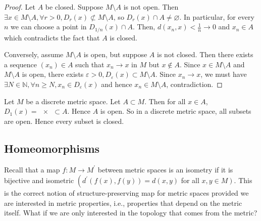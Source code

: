\documentclass[a4paper]{article}
\begin{document}
\begin{proof}
	Let \( A \) be closed.
	Suppose \( M \setminus A \) is not open.
	Then \( \exists x \in M \setminus A, \forall r > 0, D_r(x) \not\subset M \setminus A \), so \( D_r(x) \cap A \neq \varnothing \).
	In particular, for every \( n \) we can choose a point in \( D_{1/n}(x) \cap A \).
	Then, \( d(x_n,x) < \frac{1}{n} \to 0 \) and \( x_n \in A \) which contradicts the fact that \( A \) is closed.

	Conversely, assume \( M \setminus A \) is open, but suppose \( A \) is not closed.
	Then there exists a sequence \( (x_n) \in A \) such that \( x_n \to x \) in \( M \) but \( x \not\in A \).
	Since \( x \in M \setminus A \) and \( M \setminus A \) is open, there exists \( \varepsilon > 0, D_\varepsilon(x) \subset M \setminus A \).
	Since \( x_n \to x \), we must have \( \exists N \in \mathbb N, \forall n \geq N, x_n \in D_\varepsilon(x) \) and hence \( x_n \in M \setminus A \), contradiction.
\end{proof}
\begin{example}
	Let \( M \) be a discrete metric space.
	Let \( A \subset M \).
	Then for all \( x \in A \), \( D_1(x) = \qty{x} \subset A \).
	Hence \( A \) is open.
	So in a discrete metric space, all subsets are open.
	Hence every subset is closed.
\end{example}

\subsection{Homeomorphisms}
Recall that a map $f: M \rightarrow M^{\prime}$ between metric spaces is an isometry if it is bijective and isometric $\left(d^{\prime}(f(x), f(y))=d(x, y)\right.$ for all $\left.x, y \in M\right)$. This is the correct notion of structure-preserving map for metric spaces provided we are interested in metric properties, i.e., properties that depend on the metric itself. What if we are only interested in the topology that comes from the metric?
\end{document}
